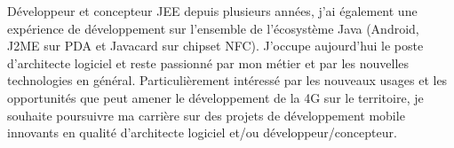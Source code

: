 \par{
Développeur et concepteur JEE depuis plusieurs années, j'ai également une expérience de développement sur l'ensemble de l'écosystème Java (Android, J2ME sur PDA et Javacard sur chipset NFC). J'occupe aujourd'hui le poste d'architecte logiciel et reste passionné par mon métier et par les nouvelles technologies en général. Particulièrement intéressé par les nouveaux usages  et les opportunités que peut amener le développement de la 4G sur le territoire, je souhaite poursuivre ma carrière sur des projets de développement mobile innovants en qualité d'architecte logiciel et/ou développeur/concepteur.
}